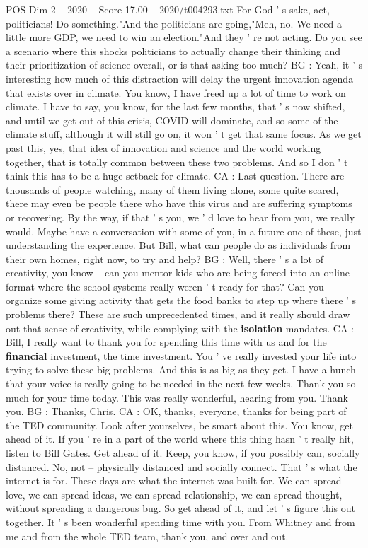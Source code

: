 \begin{textsample}{POS Dim 2 – 2020 – Score 17.00 – 2020/t004293.txt}
For God ' s sake, act, politicians!
Do something."And the politicians are going,"Meh, no.
We need a little more GDP, we need to win an election."And they ' re not acting.
Do you see a scenario where this shocks politicians to actually change their thinking and their prioritization of science overall, or is that asking too much?
BG : Yeah, it ' s interesting how much of this distraction will delay the urgent innovation agenda that exists over in climate.
You know, I have freed up a lot of time to work on climate.
I have to say, you know, for the last few months, that ' s now shifted, and until we get out of this crisis, COVID will dominate, and so some of the climate stuff, although it will still go on, it won ' t get that same focus.
As we get past this, yes, that idea of innovation and science and the world working together, that is totally common between these two problems.
And so I don ' t think this has to be a huge setback for climate.
CA : Last question.
There are thousands of people watching, many of them living alone, some quite scared, there may even be people there who have this virus and are suffering symptoms or recovering.
By the way, if that ' s you, we ' d love to hear from you, we really would.
Maybe have a conversation with some of you, in a future one of these, just understanding the experience.
But Bill, what can people do as individuals from their own homes, right now, to try and help?
BG : Well, there ' s a lot of creativity, you know -- can you mentor kids who are being forced into an online format where the school systems really weren ' t ready for that?
Can you organize some giving activity that gets the food banks to step up where there ' s problems there?
These are such unprecedented times, and it really should draw out that sense of creativity, while complying with the \textbf{isolation} mandates.
CA : Bill, I really want to thank you for spending this time with us and for the \textbf{financial} investment, the time investment.
You ' ve really invested your life into trying to solve these big problems.
And this is as big as they get.
I have a hunch that your voice is really going to be needed in the next few weeks.
Thank you so much for your time today.
This was really wonderful, hearing from you.
Thank you.
BG : Thanks, Chris.
CA : OK, thanks, everyone, thanks for being part of the TED community.
Look after yourselves, be smart about this.
You know, get ahead of it.
If you ' re in a part of the world where this thing hasn ' t really hit, listen to Bill Gates.
Get ahead of it.
Keep, you know, if you possibly can, socially distanced.
No, not -- physically distanced and socially connect.
That ' s what the internet is for.
These days are what the internet was built for.
We can spread love, we can spread ideas, we can spread relationship, we can spread thought, without spreading a dangerous bug.
So get ahead of it, and let ' s figure this out together.
It ' s been wonderful spending time with you.
From Whitney and from me and from the whole TED team, thank you, and over and out.

\end{textsample}
